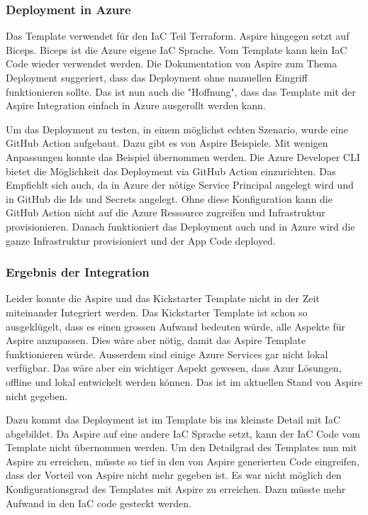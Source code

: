         \subsubsection{Deployment in Azure}

            Das Template verwendet für den IaC Teil Terraform. Aspire hingegen setzt auf Biceps. Biceps ist die Azure eigene IaC Sprache. Vom Template kann kein IaC Code wieder verwendet werden. Die Dokumentation von Aspire zum Thema Deployment suggeriert, dass das Deployment ohne manuellen Eingriff funktionieren sollte. Das ist nun auch die "Hoffnung", dass das Template mit der Aspire Integration einfach in Azure ausgerollt werden kann.

            Um das Deployment zu testen, in einem möglichst echten Szenario, wurde eine GitHub Action aufgebaut. Dazu gibt es von Aspire Beispiele. Mit wenigen Anpassungen konnte das Beispiel übernommen werden. Die Azure Developer CLI bietet die Möglichkeit das Deployment via GitHub Action einzurichten. Das Empfiehlt sich auch, da in Azure der nötige Service Principal angelegt wird und in GitHub die Ids und Secrets angelegt. Ohne diese Konfiguration kann die GitHub Action nicht auf die Azure Ressource zugreifen und Infrastruktur provisionieren. Danach funktioniert das Deployment auch und in Azure wird die ganze Infrastruktur provisioniert und der App Code deployed.

        \subsubsection{Ergebnis der Integration}
            Leider konnte die Aspire und das Kickstarter Template nicht in der Zeit miteinander Integriert werden. Das Kickstarter Template ist schon so ausgeklügelt, dass es einen grossen Aufwand bedeuten würde, alle Aspekte für Aspire anzupassen. Dies wäre aber nötig, damit das Aspire Template funktionieren würde. Ausserdem sind einige Azure Services gar nicht lokal verfügbar. Das wäre aber ein wichtiger Aspekt gewesen, dass Azur Lösungen, offline und lokal entwickelt werden können. Das ist im aktuellen Stand von Aspire nicht gegeben. 

            Dazu kommt das Deployment ist im Template bis ins kleinste Detail mit IaC abgebildet. Da Aspire auf eine andere IaC Sprache setzt, kann der IaC Code vom Template nicht übernommen werden. Um den Detailgrad des Templates nun mit Aspire zu erreichen, müsste so tief in den von Aspire generierten Code eingreifen, dass der Vorteil von Aspire nicht mehr gegeben ist. Es war nicht möglich den Konfigurationsgrad des Templates mit Aspire zu erreichen. Dazu müsste mehr Aufwand in den IaC code gesteckt werden.
            
